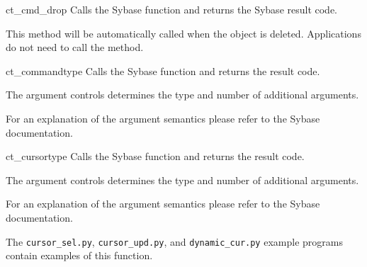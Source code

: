 \begin{methoddesc}[CS_COMMAND]{ct_cmd_drop}{}
Calls the Sybase  function and returns the
Sybase result code.

This method will be automatically called when the 
object is deleted.  Applications do not need to call the method.
\end{methoddesc}

\begin{methoddesc}[CS_COMMAND]{ct_command}{type \optional{, \ldots}}
Calls the Sybase  function and returns the
result code.

The  argument controls determines the type and number of
additional arguments.






For an explanation of the argument semantics please refer to the
Sybase documentation.
\end{methoddesc}

\begin{methoddesc}[CS_COMMAND]{ct_cursor}{type \optional{, \ldots}}
Calls the Sybase  function and returns the
result code.

The  argument controls determines the type and number of
additional arguments.









For an explanation of the argument semantics please refer to the
Sybase documentation.

The \texttt{cursor_sel.py}, \texttt{cursor_upd.py}, and
\texttt{dynamic_cur.py} example programs contain examples of this
function.
\end{methoddesc}

